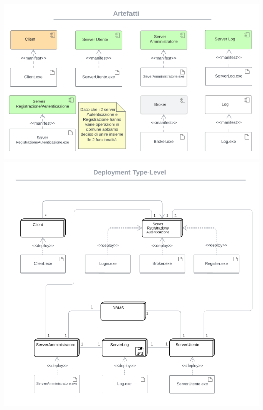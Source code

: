 \includegraphics[width=1\textwidth]{assets/img/deployment/artefatti.png}\\
\includegraphics[width=1\textwidth]{assets/img/deployment/deployment.png}\\